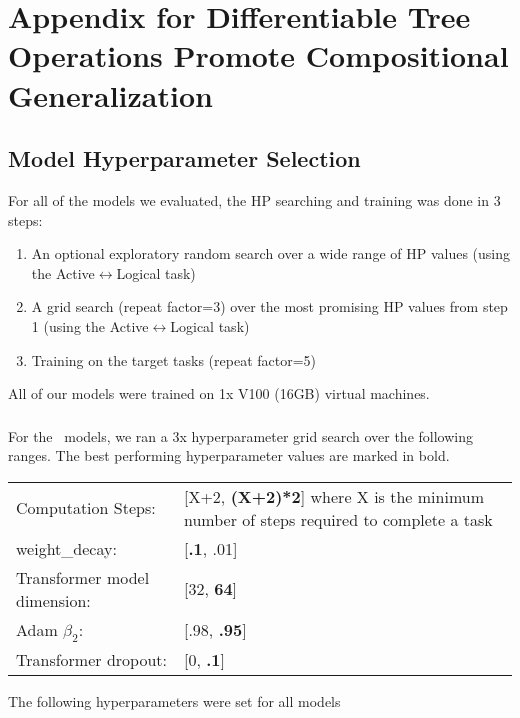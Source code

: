 \chapter{Appendix for Differentiable Tree Operations Promote Compositional Generalization} \label{chap:appendix-b}

\section{Model Hyperparameter Selection}
\raggedbottom

For all of the models we evaluated, the HP searching and training was done in 3 steps:
\begin{enumerate}
   \item An optional exploratory random search over a wide range of HP values (using the Active$\leftrightarrow$Logical task) 
   \item A grid search (repeat factor=3) over the most promising HP values from step 1 (using the Active$\leftrightarrow$Logical task) 
   \item Training on the target tasks (repeat factor=5) 
\end{enumerate}

All of our models were trained on 1x V100 (16GB) virtual machines.  

\subsection{\blackboard} \label{sec:blackboard-training}
For the \blackboard\ models, we ran a 3x hyperparameter grid search over the following ranges. The best performing hyperparameter values are marked in bold.


\begin{tabular}{ll}
    Computation Steps: & [X+2, \textbf{(X+2)*2}] where X is the minimum number of steps required to complete a task \\  
    weight\_decay: & [\textbf{.1}, .01] \\
    Transformer model dimension: & [32, \textbf{64}] \\
    Adam $\beta_2$: & [.98, \textbf{.95}] \\
    Transformer dropout: & [0, \textbf{.1}] \\
\end{tabular}

The following hyperparameters were set for all models

